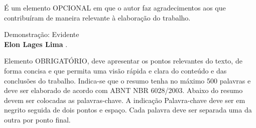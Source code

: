 \begin{agradecimentos}

É um elemento OPCIONAL em que o autor faz agradecimentos aos que contribuíram de
maneira relevante à elaboração do trabalho.

\end{agradecimentos}

\begin{epigrafe}
Demonstração: Evidente \\
\textbf{Elon Lages Lima} \cite[p. 154]{elon}.
\end{epigrafe}


\begin{resumo}
Elemento OBRIGATÓRIO, deve apresentar os pontos relevantes do texto, de forma
concisa e que permita uma visão rápida e clara do conteúdo e das conclusões do
trabalho. Indica-se que o resumo tenha no máximo 500 palavras e deve ser
elaborado de acordo com ABNT NBR 6028/2003. Abaixo do resumo devem ser 
colocadas as palavras-chave. A indicação Palavra-chave deve ser em negrito 
seguida de dois pontos e espaço. Cada palavra deve ser separada uma da outra 
por ponto final.
\end{resumo}


